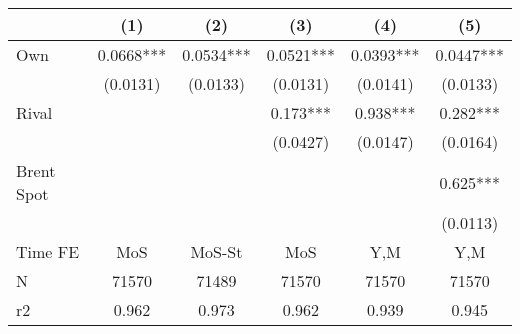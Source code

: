 {
\def\sym#1{\ifmmode^{#1}\else\(^{#1}\)\fi}
\begin{tabular}{l*{5}{c}}
\toprule
                &\multicolumn{1}{c}{(1)}   &\multicolumn{1}{c}{(2)}   &\multicolumn{1}{c}{(3)}   &\multicolumn{1}{c}{(4)}   &\multicolumn{1}{c}{(5)}   \\
\midrule
Own             &   0.0668***&   0.0534***&   0.0521***&   0.0393***&   0.0447***\\
                & (0.0131)   & (0.0133)   & (0.0131)   & (0.0141)   & (0.0133)   \\
\addlinespace
Rival           &            &            &    0.173***&    0.938***&    0.282***\\
                &            &            & (0.0427)   & (0.0147)   & (0.0164)   \\
\addlinespace
Brent Spot      &            &            &            &            &    0.625***\\
                &            &            &            &            & (0.0113)   \\
\midrule
Time FE         &      MoS   &   MoS-St   &      MoS   &      Y,M   &      Y,M   \\
N               &    71570   &    71489   &    71570   &    71570   &    71570   \\
r2              &    0.962   &    0.973   &    0.962   &    0.939   &    0.945   \\
\bottomrule
\end{tabular}
}
